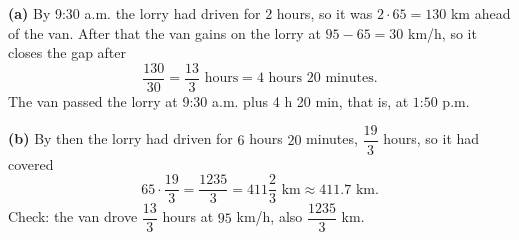 \textbf{(a)} By 9:30 a.m. the lorry had driven for $2$ hours, so it was $2\cdot65=130$ km ahead of the van. After that the van gains on the lorry at $95-65=30$ km/h, so it closes the gap after
\[
\dfrac{130}{30}=\dfrac{13}{3}\text{ hours}=4\text{ hours }20\text{ minutes}.
\]
The van passed the lorry at 9:30 a.m. plus 4 h 20 min, that is, at $\boxed{\text{1:50 p.m.}}$

\textbf{(b)} By then the lorry had driven for $6$ hours $20$ minutes, $\dfrac{19}{3}$ hours, so it had covered
\[
65\cdot\dfrac{19}{3}=\dfrac{1235}{3}=\boxed{411\dfrac{2}{3}\text{ km}}\approx 411.7\text{ km}.
\]
Check: the van drove $\dfrac{13}{3}$ hours at $95$ km/h, also $\dfrac{1235}{3}$ km.
